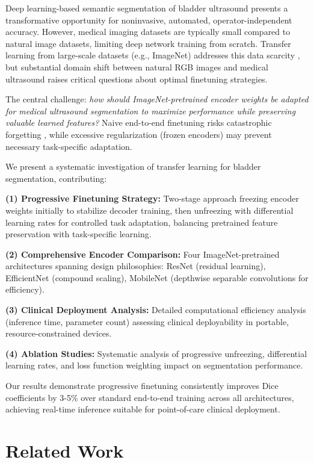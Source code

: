 \documentclass{article}
\begin{document}
Deep learning-based semantic segmentation of bladder ultrasound presents a transformative opportunity for noninvasive, automated, operator-independent accuracy. However, medical imaging datasets are typically small compared to natural image datasets, limiting deep network training from scratch. Transfer learning from large-scale datasets (e.g., ImageNet) addresses this data scarcity \cite{ref4,ref5}, but substantial domain shift between natural RGB images and medical ultrasound raises critical questions about optimal finetuning strategies.

The central challenge: \textit{how should ImageNet-pretrained encoder weights be adapted for medical ultrasound segmentation to maximize performance while preserving valuable learned features?} Naive end-to-end finetuning risks catastrophic forgetting \cite{ref6}, while excessive regularization (frozen encoders) may prevent necessary task-specific adaptation.

We present a systematic investigation of transfer learning for bladder segmentation, contributing:

\textbf{(1) Progressive Finetuning Strategy:} Two-stage approach freezing encoder weights initially to stabilize decoder training, then unfreezing with differential learning rates for controlled task adaptation, balancing pretrained feature preservation with task-specific learning.

\textbf{(2) Comprehensive Encoder Comparison:} Four ImageNet-pretrained architectures spanning design philosophies: ResNet (residual learning), EfficientNet (compound scaling), MobileNet (depthwise separable convolutions for efficiency).

\textbf{(3) Clinical Deployment Analysis:} Detailed computational efficiency analysis (inference time, parameter count) assessing clinical deployability in portable, resource-constrained devices.

\textbf{(4) Ablation Studies:} Systematic analysis of progressive unfreezing, differential learning rates, and loss function weighting impact on segmentation performance.

Our results demonstrate progressive finetuning consistently improves Dice coefficients by 3-5\% over standard end-to-end training across all architectures, achieving real-time inference suitable for point-of-care clinical deployment.

\section{Related Work}
\label{sec:related}
\end{document}
